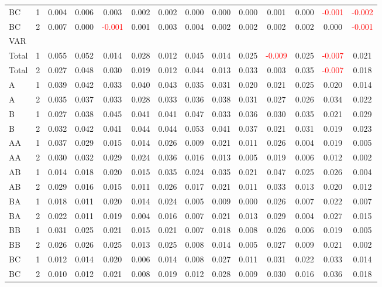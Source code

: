 \begin{table}[H]
{\begin{tabular}{llcccccccccccc}
BC & 1 & 0.004 & 0.006 & 0.003 & 0.002 & 0.002 & 0.000 & 0.000 & 0.000 & 0.001 & 0.000 & \textcolor{red}{-0.001} & \textcolor{red}{-0.002}\\
BC & 2 & 0.007 & 0.000 & \textcolor{red}{-0.001} & 0.001 & 0.003 & 0.004 & 0.002 & 0.002 & 0.002 & 0.002 & 0.000 & \textcolor{red}{-0.001}\\
\hline
VAR &  &  &  &  &  &  &  &  &  &  &  &  & \\
\hline
Total & 1 & 0.055 & 0.052 & 0.014 & 0.028 & 0.012 & 0.045 & 0.014 & 0.025 & \textcolor{red}{-0.009} & 0.025 & \textcolor{red}{-0.007} & 0.021\\
Total & 2 & 0.027 & 0.048 & 0.030 & 0.019 & 0.012 & 0.044 & 0.013 & 0.033 & 0.003 & 0.035 & \textcolor{red}{-0.007} & 0.018\\
A & 1 & 0.039 & 0.042 & 0.033 & 0.040 & 0.043 & 0.035 & 0.031 & 0.020 & 0.021 & 0.025 & 0.020 & 0.014\\
A & 2 & 0.035 & 0.037 & 0.033 & 0.028 & 0.033 & 0.036 & 0.038 & 0.031 & 0.027 & 0.026 & 0.034 & 0.022\\
B & 1 & 0.027 & 0.038 & 0.045 & 0.041 & 0.041 & 0.047 & 0.033 & 0.036 & 0.030 & 0.035 & 0.021 & 0.029\\
B & 2 & 0.032 & 0.042 & 0.041 & 0.044 & 0.044 & 0.053 & 0.041 & 0.037 & 0.021 & 0.031 & 0.019 & 0.023\\
AA & 1 & 0.037 & 0.029 & 0.015 & 0.014 & 0.026 & 0.009 & 0.021 & 0.011 & 0.026 & 0.004 & 0.019 & 0.005\\
AA & 2 & 0.030 & 0.032 & 0.029 & 0.024 & 0.036 & 0.016 & 0.013 & 0.005 & 0.019 & 0.006 & 0.012 & 0.002\\
AB & 1 & 0.014 & 0.018 & 0.020 & 0.015 & 0.035 & 0.024 & 0.035 & 0.021 & 0.047 & 0.025 & 0.026 & 0.004\\
AB & 2 & 0.029 & 0.016 & 0.015 & 0.011 & 0.026 & 0.017 & 0.021 & 0.011 & 0.033 & 0.013 & 0.020 & 0.012\\
BA & 1 & 0.018 & 0.011 & 0.020 & 0.014 & 0.024 & 0.005 & 0.009 & 0.000 & 0.026 & 0.007 & 0.022 & 0.007\\
BA & 2 & 0.022 & 0.011 & 0.019 & 0.004 & 0.016 & 0.007 & 0.021 & 0.013 & 0.029 & 0.004 & 0.027 & 0.015\\
BB & 1 & 0.031 & 0.025 & 0.021 & 0.015 & 0.021 & 0.007 & 0.018 & 0.008 & 0.026 & 0.006 & 0.019 & 0.005\\
BB & 2 & 0.026 & 0.026 & 0.025 & 0.013 & 0.025 & 0.008 & 0.014 & 0.005 & 0.027 & 0.009 & 0.021 & 0.002\\
BC & 1 & 0.012 & 0.014 & 0.020 & 0.006 & 0.014 & 0.008 & 0.027 & 0.011 & 0.031 & 0.022 & 0.033 & 0.014\\
BC & 2 & 0.010 & 0.012 & 0.021 & 0.008 & 0.019 & 0.012 & 0.028 & 0.009 & 0.030 & 0.016 & 0.036 & 0.018\\
\hline
    \end{tabular}%
    }
    \label{tab:cen2_sh}
\end{table}

